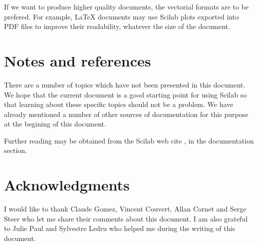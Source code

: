 If we want to produce higher quality documents, the vectorial 
formats are to be prefered. For example, \LaTeX{} documents may use Scilab 
plots exported into PDF files to improve their readability, whatever
the size of the document.

\section{Notes and references}

There are a number of topics which have not been presented 
in this document. We hope that the current document is a good starting 
point for using Scilab so that learning about these specific 
topics should not be a problem. We have already mentioned a 
number of other sources of documentation for this purpose
at the begining of this document. 


Further reading may be obtained from the Scilab web cite \cite{WWWScilab},
in the documentation section.

\section{Acknowledgments}

I would like to thank Claude Gomez, Vincent Couvert, 
Allan Cornet and Serge Steer who let me share their comments about this document. 
I am also grateful to Julie Paul and Sylvestre Ledru who helped me during the writing 
of this document. 




